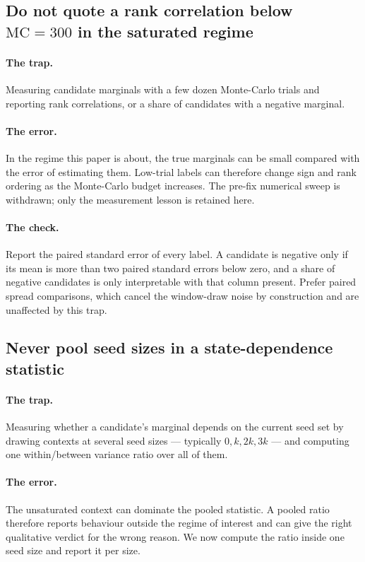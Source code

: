 \subsection{Do not quote a rank correlation below $\mathrm{MC} = 300$ in the saturated regime}

\paragraph{The trap.} Measuring candidate marginals with a few dozen Monte-Carlo trials and
reporting rank correlations, or a share of candidates with a negative marginal.

\paragraph{The error.} In the regime this paper is about, the true marginals can be small compared
with the error of estimating them. Low-trial labels can therefore change sign and rank ordering as
the Monte-Carlo budget increases. The pre-fix numerical sweep is withdrawn; only the measurement
lesson is retained here.

\paragraph{The check.} Report the paired standard error of every label. A candidate is negative only
if its mean is more than two paired standard errors below zero, and a share of negative candidates
is only interpretable with that column present. Prefer paired spread comparisons, which cancel the
window-draw noise by construction and are unaffected by this trap.

\subsection{Never pool seed sizes in a state-dependence statistic}

\paragraph{The trap.} Measuring whether a candidate's marginal depends on the current seed set by
drawing contexts at several seed sizes --- typically $0, k, 2k, 3k$ --- and computing one
within/between variance ratio over all of them.

\paragraph{The error.} The unsaturated context can dominate the pooled statistic. A pooled ratio
therefore reports behaviour outside the regime of interest and can give the right qualitative
verdict for the wrong reason. We now compute the ratio inside one seed size and report it per size.

